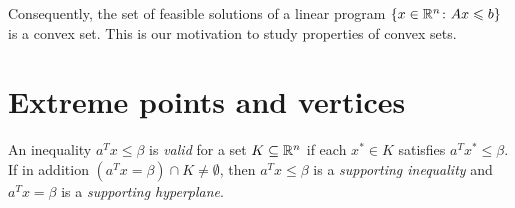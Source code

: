 Consequently, the set of feasible solutions of a linear program $\{x
\in \mathbb{R}^n \colon Ax \leqslant b\}$ is a convex set. This is our motivation
to study properties of convex sets.


\section{Extreme points and vertices}
\label{sec:extr-points-vert}


\begin{definition}
  An inequality $a^Tx \leq \beta$ is \emph{valid} for a  set $K \subseteq \mathbb{R}^n$ if each $x^* \in K$ satisfies $a^Tx^* \leq \beta$.  If in addition $(a^Tx = β) \cap K \neq\emptyset$,
then $a^Tx\leq β$ is a \emph{supporting inequality} and $a^Tx = β$ is a
\emph{supporting hyperplane}. 
\end{definition}



     
      
      
      
      
          
      
          
    



